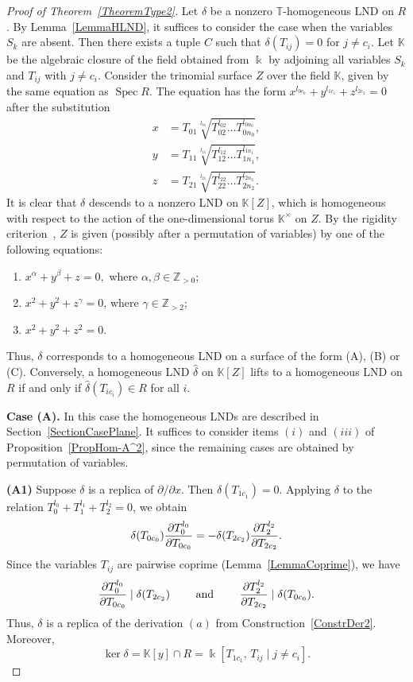\documentclass[a4paper,reqno,12pt]{amsart}
\theoremstyle{plain}
\theoremstyle{definition}
\theoremstyle{plain}
\theoremstyle{remark}
\DeclareMathOperator{\Spec}{Spec}
\newcommand{\KK}{\mathbb K}
\newcommand{\TT}{\mathbb{T}}
\newcommand{\ZZ}{\mathbb Z}
\newcommand{\kk}{\Bbbk}
\begin{document}
\begin{proof}[Proof of Theorem~\ref{TheoremType2}]
    Let $\delta$ be a nonzero ${\TT}$-homogeneous LND on $R$. By Lemma~\ref{LemmaHLND}, it suffices to consider the case when the variables $S_k$ are absent. Then there exists a tuple $C$ such that $\delta(T_{ij})=0$ for $j\neq c_i$.
   Let $\KK$ be the algebraic closure of the field obtained from $\Bbbk$ by adjoining all variables $S_k$ and $T_{ij}$ with $j\neq c_i$.
    Consider the trinomial surface $Z$ over the field $\KK$, given by the same equation as $\Spec R$. The equation has the form $x^{l_{0c_0}}+y^{l_{1c_1}}+z^{l_{2c_2}}=0$ after the substitution
    \begin{equation*}
    \begin{split}
        x &= T_{01}\sqrt[l_{01}]{T_{02}^{l_{02}}\dots T_{0n_0}^{l_{0n_0}}},\\
        y &= T_{11}\sqrt[l_{11}]{T_{12}^{l_{12}}\dots T_{1n_1}^{l_{1n_1}}},\\
        z &= T_{21}\sqrt[l_{21}]{T_{22}^{l_{22}}\dots T_{2n_2}^{l_{2n_2}}}.
    \end{split}
    \end{equation*} 
    It is clear that $\delta$ descends to a nonzero LND on $\KK[Z]$, which is homogeneous with respect to the action of the one-dimensional torus $\KK^\times$ on $Z$. By the rigidity criterion~\cite[Theorem~4]{EGSh}, $Z$ is given (possibly after a permutation of variables) by one of the following equations:
    \begin{enumerate}
        \item [{\rm (A)}] $x^\alpha+y^\beta+z=0,$ where $\alpha,\beta\in\ZZ_{>0}$;
        \item [(B)] $x^2+y^2+z^\gamma=0$, where $\gamma\in\ZZ_{>2}$;
        \item [(C)] $x^2+y^2+z^2=0$.
    \end{enumerate}
    Thus, $\delta$ corresponds to a homogeneous LND on a surface of the form (A), (B) or (C). Conversely, a homogeneous LND $\hat\delta$ on $\KK[Z]$ lifts to a homogeneous LND on $R$ if and only if $\hat\delta(T_{ic_i})\in R$ for all $i$.

    \textbf{Case (A).} In this case the homogeneous LNDs are described in Section~\ref{SectionCasePlane}. It suffices to consider items $(i)$ and $(iii)$ of Proposition~\ref{PropHom-A^2}, since the remaining cases are obtained by permutation of variables.

    \textbf{(A1)}
    Suppose $\delta$ is a replica of ${\partial/\partial x}$. Then $\delta(T_{1c_1})=0$. Applying $\delta$ to the relation $T_0^{l_0}+T_1^{l_1}+ T_{2}^{l_2}=0$, we obtain
    $$
    \delta(T_{0c_0}){\partial T_0^{l_0}\over\partial T_{0c_0}}=-\delta(T_{2c_2}){\partial T_2^{l_2}\over\partial T_{2c_2}}.
    $$
    Since the variables $T_{ij}$ are pairwise coprime (Lemma~\ref{LemmaCoprime}), we have
    $$
    {\partial T_0^{l_0}\over\partial T_{0c_0}}\mid \delta(T_{2c_2}) \qquad\mbox{ and }\qquad {\partial T_2^{l_2}\over\partial T_{2c_2}}\mid \delta(T_{0c_0}).
    $$
    Thus, $\delta$ is a replica of the derivation $(a)$ from Construction~\ref{ConstrDer2}. Moreover, $$\ker\delta=\KK[y]\cap R=\kk[T_{1c_1},\,T_{ij}\mid j\neq c_i].$$


\end{proof}
\end{document}
